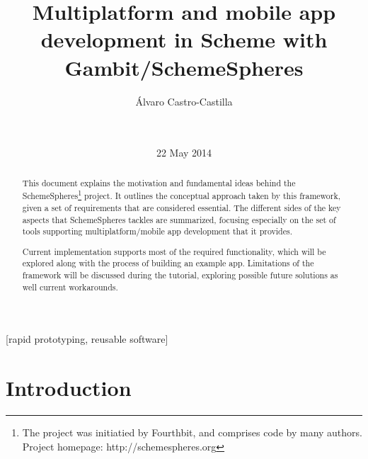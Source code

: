 \documentclass{acm_proc_article-sp}
\begin{document}
\title{Multiplatform and mobile app development in Scheme with Gambit/SchemeSpheres}

\author{
\alignauthor
Álvaro Castro-Castilla\\
       \\
       \\
}
\date{22 May 2014}

\maketitle
\begin{abstract}

This document explains the motivation and fundamental ideas behind the SchemeSpheres\footnote{The project was initiatied by Fourthbit, and comprises code by many authors. Project homepage: http://schemespheres.org} project. It outlines the conceptual approach taken by this framework, given a set of requirements that are considered essential. The different sides of the key aspects that SchemeSpheres tackles are summarized, focusing especially on the set of tools supporting multiplatform/mobile app development that it provides.

Current implementation supports most of the required functionality, which will be explored along with the process of building an example app. Limitations of the framework will be discussed during the tutorial, exploring possible future solutions as well current workarounds.

\end{abstract}

[rapid prototyping, reusable software]




\section{Introduction}
\end{document}
